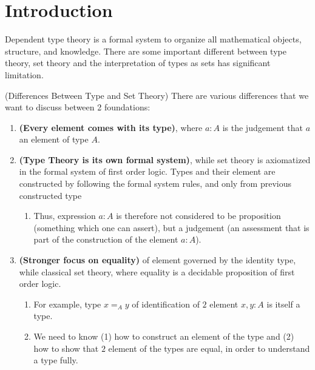 \section{Introduction}

Dependent type theory is a formal system to organize all mathematical objects,
structure, and knowledge. There are some important different between type theory, set theory and the interpretation of types as sets has significant limitation.

\begin{remark}{(Differences Between Type and Set Theory)}
    There are various differences that we want to discuss between 2 foundations:
    \begin{enumerate}
        \item \textbf{(Every element comes with its type)}, where $a:A$ is the judgement that $a$ an element of type $A$. 
        \item \textbf{(Type Theory is its own formal system)}, while set theory is axiomatized in the formal system of first order logic. Types and their element are constructed by following the formal system rules, and only from previous constructed type
        \begin{enumerate}
            \item Thus, expression $a:A$ is therefore not considered to be proposition (something which one can assert), but a judgement (an assessment that is part of the construction of the element $a:A$). 
        \end{enumerate}
        \item \textbf{(Stronger focus on equality)} of element governed by the identity type, while classical set theory, where equality is a decidable proposition of first order logic. 
        \begin{enumerate}
            \item For example, type $x=_Ay$ of identification of $2$ element $x,y:A$ is itself a type.
            \item We need to know (1) how to construct an element of the type and (2) how to show that $2$ element of the types are equal, in order to understand a type fully. 
        \end{enumerate}
    \end{enumerate}
\end{remark}

